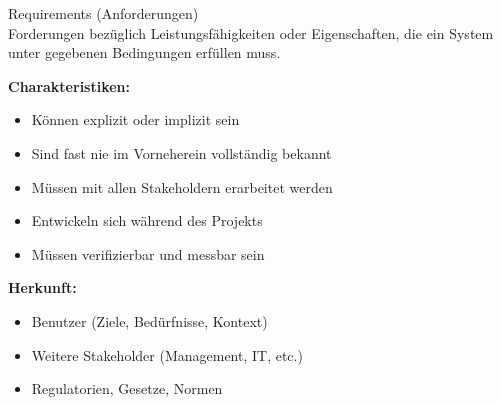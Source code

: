 \begin{definition}{Requirements (Anforderungen)}\\
Forderungen bezüglich Leistungsfähigkeiten oder Eigenschaften, die ein System unter gegebenen Bedingungen erfüllen muss.

\textbf{Charakteristiken:}
\begin{itemize}
    \item Können explizit oder implizit sein
    \item Sind fast nie im Vorneherein vollständig bekannt
    \item Müssen mit allen Stakeholdern erarbeitet werden
    \item Entwickeln sich während des Projekts
    \item Müssen verifizierbar und messbar sein
\end{itemize}

\textbf{Herkunft:}
\begin{itemize}
    \item Benutzer (Ziele, Bedürfnisse, Kontext)
    \item Weitere Stakeholder (Management, IT, etc.)
    \item Regulatorien, Gesetze, Normen
\end{itemize}
\end{definition}

